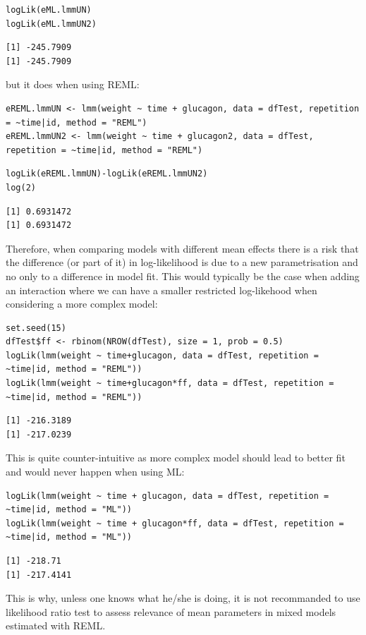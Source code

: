 \documentclass[12pt]{article}
\begin{document}
\lstset{language=r,label= ,caption= ,captionpos=b,numbers=none}
\begin{lstlisting}
logLik(eML.lmmUN)
logLik(eML.lmmUN2)
\end{lstlisting}

\begin{verbatim}
[1] -245.7909
[1] -245.7909
\end{verbatim}


but it does when using REML:
\lstset{language=r,label= ,caption= ,captionpos=b,numbers=none}
\begin{lstlisting}
eREML.lmmUN <- lmm(weight ~ time + glucagon, data = dfTest, repetition = ~time|id, method = "REML")
eREML.lmmUN2 <- lmm(weight ~ time + glucagon2, data = dfTest, repetition = ~time|id, method = "REML")
\end{lstlisting}

\lstset{language=r,label= ,caption= ,captionpos=b,numbers=none}
\begin{lstlisting}
logLik(eREML.lmmUN)-logLik(eREML.lmmUN2)
log(2)
\end{lstlisting}

\begin{verbatim}
[1] 0.6931472
[1] 0.6931472
\end{verbatim}


Therefore, when comparing models with different mean effects there is
a risk that the difference (or part of it) in log-likelihood is due to
a new parametrisation and no only to a difference in model fit. This
would typically be the case when adding an interaction where we can
have a smaller restricted log-likehood when considering a more complex
model:

\lstset{language=r,label= ,caption= ,captionpos=b,numbers=none}
\begin{lstlisting}
set.seed(15) 
dfTest$ff <- rbinom(NROW(dfTest), size = 1, prob = 0.5)
logLik(lmm(weight ~ time+glucagon, data = dfTest, repetition = ~time|id, method = "REML"))
logLik(lmm(weight ~ time+glucagon*ff, data = dfTest, repetition = ~time|id, method = "REML"))
\end{lstlisting}

\begin{verbatim}
[1] -216.3189
[1] -217.0239
\end{verbatim}


This is quite counter-intuitive as more complex model should lead to
better fit and would never happen when using ML:
\lstset{language=r,label= ,caption= ,captionpos=b,numbers=none}
\begin{lstlisting}
logLik(lmm(weight ~ time + glucagon, data = dfTest, repetition = ~time|id, method = "ML"))
logLik(lmm(weight ~ time + glucagon*ff, data = dfTest, repetition = ~time|id, method = "ML"))
\end{lstlisting}

\begin{verbatim}
[1] -218.71
[1] -217.4141
\end{verbatim}


This is why, unless one knows what he/she is doing, it is not
recommanded to use likelihood ratio test to assess relevance of mean
parameters in mixed models estimated with REML.
\end{document}
